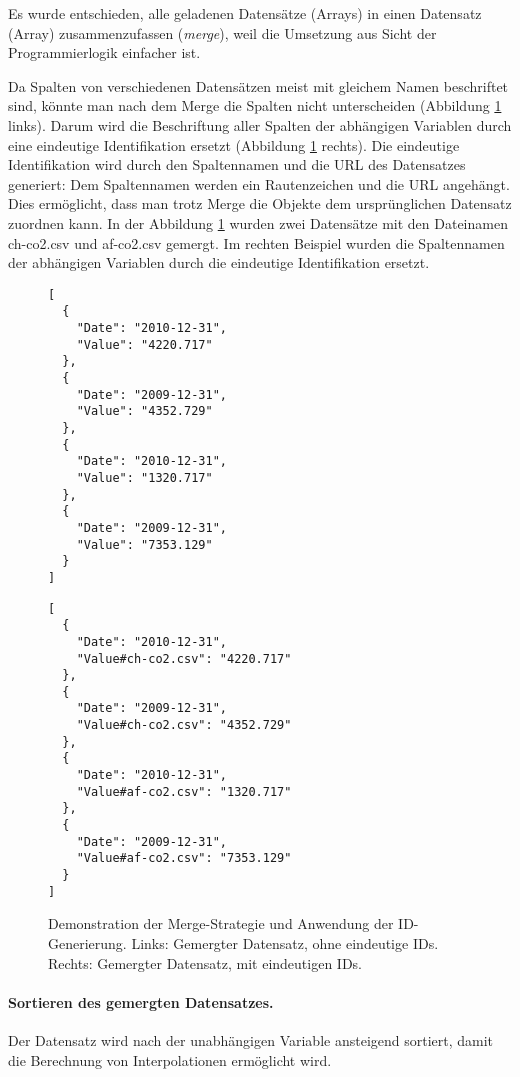 Es wurde entschieden, alle geladenen Datensätze (Arrays) in einen Datensatz (Array) zusammenzufassen (\textit{merge}), weil die Umsetzung aus Sicht der Programmierlogik einfacher ist. 

Da Spalten von verschiedenen Datensätzen meist mit gleichem Namen beschriftet sind, könnte man nach dem Merge die Spalten nicht unterscheiden (Abbildung \ref{fig:merge} links). Darum wird die Beschriftung aller Spalten der abhängigen Variablen durch eine eindeutige Identifikation ersetzt (Abbildung \ref{fig:merge} rechts). Die eindeutige Identifikation wird durch den Spaltennamen und die URL des Datensatzes generiert: Dem Spaltennamen werden ein Rautenzeichen und die URL angehängt. Dies ermöglicht, dass man trotz Merge die Objekte dem ursprünglichen Datensatz zuordnen kann.
\newpage
In der Abbildung \ref{fig:merge} wurden zwei Datensätze mit den Dateinamen ch-co2.csv und af-co2.csv gemergt. Im rechten Beispiel wurden die Spaltennamen der abhängigen Variablen durch die eindeutige Identifikation ersetzt.

\begin{figure}[H]
	\centering
	\begin{minipage}{0.40\textwidth}
		\centering
		\begin{verbatim}
[
  {
    "Date": "2010-12-31",
    "Value": "4220.717"
  },
  {
    "Date": "2009-12-31",
    "Value": "4352.729"
  },
  {
    "Date": "2010-12-31",
    "Value": "1320.717"
  },
  {
    "Date": "2009-12-31",
    "Value": "7353.129"
  }
]
		\end{verbatim}
	\end{minipage}\hfill
	\begin{minipage}{0.5\textwidth}
		\centering
		\begin{verbatim}
[
  {
    "Date": "2010-12-31",
    "Value#ch-co2.csv": "4220.717"
  },
  {
    "Date": "2009-12-31",
    "Value#ch-co2.csv": "4352.729"
  },
  {
    "Date": "2010-12-31",
    "Value#af-co2.csv": "1320.717"
  },
  {
    "Date": "2009-12-31",
    "Value#af-co2.csv": "7353.129"
  }
]
		\end{verbatim}
	\end{minipage}
	\caption[Merge-Strategie]{Demonstration der Merge-Strategie und Anwendung der ID-Generierung. Links: Gemergter Datensatz, ohne eindeutige IDs. Rechts: Gemergter Datensatz, mit eindeutigen IDs.}
	\label{fig:merge}
\end{figure}

\paragraph{Sortieren des gemergten Datensatzes.} Der Datensatz wird nach der unabhängigen Variable ansteigend sortiert, damit die Berechnung von Interpolationen ermöglicht wird.


